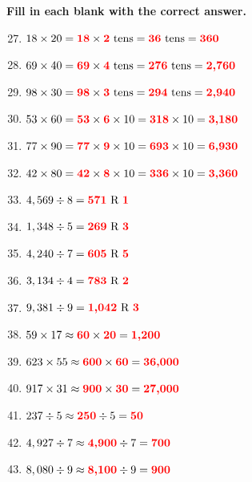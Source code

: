 \documentclass[11pt, a4paper]{article}
\newcommand{\answerline}[1]{\textcolor{red}{\textbf{#1}}}
\begin{document}
\vspace{1cm}
\textbf{Fill in each blank with the correct answer.}

\begin{enumerate}[label=\arabic*.]
    \setcounter{enumi}{26}
    \item $18 \times 20 = \text{\answerline{18}} \times \text{\answerline{2}} \text{ tens} = \text{\answerline{36}} \text{ tens} = \text{\answerline{360}}$
    \item $69 \times 40 = \text{\answerline{69}} \times \text{\answerline{4}} \text{ tens} = \text{\answerline{276}} \text{ tens} = \text{\answerline{2,760}}$
    \item $98 \times 30 = \text{\answerline{98}} \times \text{\answerline{3}} \text{ tens} = \text{\answerline{294}} \text{ tens} = \text{\answerline{2,940}}$
    \item $53 \times 60 = \text{\answerline{53}} \times \text{\answerline{6}} \times 10 = \text{\answerline{318}} \times 10 = \text{\answerline{3,180}}$
    \item $77 \times 90 = \text{\answerline{77}} \times \text{\answerline{9}} \times 10 = \text{\answerline{693}} \times 10 = \text{\answerline{6,930}}$
    \item $42 \times 80 = \text{\answerline{42}} \times \text{\answerline{8}} \times 10 = \text{\answerline{336}} \times 10 = \text{\answerline{3,360}}$
\end{enumerate}

\pagebreak

\begin{enumerate}[label=\arabic*.]
    \setcounter{enumi}{32}
    \item $4,569 \div 8 = \text{\answerline{571}} \text{ R } \text{\answerline{1}}$
    \item $1,348 \div 5 = \text{\answerline{269}} \text{ R } \text{\answerline{3}}$
    \item $4,240 \div 7 = \text{\answerline{605}} \text{ R } \text{\answerline{5}}$
    \item $3,134 \div 4 = \text{\answerline{783}} \text{ R } \text{\answerline{2}}$
    \item $9,381 \div 9 = \text{\answerline{1,042}} \text{ R } \text{\answerline{3}}$

    \vspace{1cm}
    \item $59 \times 17 \approx \text{\answerline{60}} \times \text{\answerline{20}} = \text{\answerline{1,200}}$
    \item $623 \times 55 \approx \text{\answerline{600}} \times \text{\answerline{60}} = \text{\answerline{36,000}}$
    \item $917 \times 31 \approx \text{\answerline{900}} \times \text{\answerline{30}} = \text{\answerline{27,000}}$
    \item $237 \div 5 \approx \text{\answerline{250}} \div 5 = \text{\answerline{50}}$
    \item $4,927 \div 7 \approx \text{\answerline{4,900}} \div 7 = \text{\answerline{700}}$
    \item $8,080 \div 9 \approx \text{\answerline{8,100}} \div 9 = \text{\answerline{900}}$
\end{enumerate}
\end{document}

